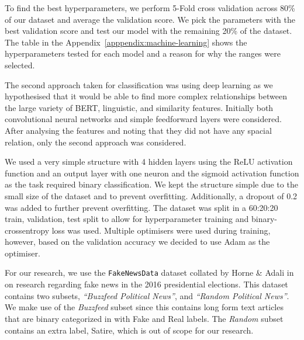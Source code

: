 \documentclass{article}
\begin{document}
To find the best hyperparameters, we perform 5-Fold cross validation across 80\% of our dataset and average the validation score. We pick the parameters with the best validation score and test our model with the remaining 20\% of the dataset. The table in the Appendix~\ref{apppendix:machine-learning} shows the hyperparameters tested for each model and a reason for why the ranges were selected.


The second approach taken for classification was using deep learning as we hypothesised that it would be able to find more complex relationships between the large variety of BERT, linguistic, and similarity features. Initially both convolutional neural networks and simple feedforward layers were considered. After analysing the features and noting that they did not have any spacial relation, only the second approach was considered.

We used a very simple structure with 4 hidden layers using the ReLU activation function and an output layer with one neuron and the sigmoid activation function as the task required binary classification. We kept the structure simple due to the small size of the dataset and to prevent overfitting. Additionally, a dropout of 0.2 was added to further prevent overfitting. The dataset was split in a 60:20:20 train, validation, test split to allow for hyperparameter training and binary-crossentropy loss was used. Multiple optimisers were used during training, however, based on the validation accuracy we decided to use Adam as the optimiser.

\label{section:experimental-setup}

\label{section:dataset}

For our research, we use the \verb|FakeNewsData| dataset collated by Horne \& Adali in~\cite{horne2017} on research regarding fake news in the 2016 presidential elections. This dataset contains two subsets, \emph{``Buzzfeed Political News''}, and \emph{``Random Political News''}. We make use of the \emph{Buzzfeed} subset since this contains long form text articles that are binary categorized in with Fake and Real labels. The \emph{Random} subset contains an extra label, Satire, which is out of scope for our research.
\end{document}
